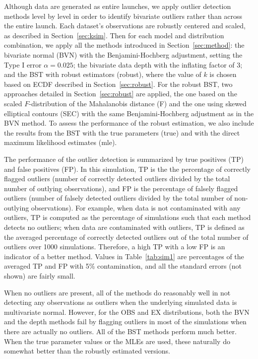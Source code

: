 \documentclass[12pt]{article}
\begin{document}
\begin{doublespacing}
Although data are generated as entire launches, we apply outlier detection methods level by level in order to identify bivariate outliers rather than across the entire launch.  Each dataset's observations are robustly centered and scaled, as described in Section~\ref{sec:ksim}. Then for each model and distribution combination, we apply all the methods introduced in Section~\ref{sec:method}:  the bivariate normal (BVN) with the Benjamini-Hochberg adjustment, setting the Type I error $\alpha=0.025$; the bivariate data depth with the inflating factor of 3; and the BST with robust estimators (robust), where the value of $k$ is chosen based on ECDF described in Section~\ref{sec:robust}. For the robust BST, two approaches detailed in Section~\ref{sec:robust} are applied, the one based on the scaled $F$-distribution of the Mahalanobis distance (F) and the one using skewed elliptical contours (SEC) with the same Benjamini-Hochberg adjustment as in the BVN method. To assess the performance of the robust estimation, we also include the results from the BST with the true parameters (true) and with the direct maximum likelihood estimates (mle).

The performance of the outlier detection is summarized by true positives (TP) and false positives (FP). In this simulation, TP is the the percentage of correctly flagged outliers (number of correctly detected outliers divided by the total number of outlying observations), and FP is the percentage of falsely flagged outliers (number of falsely detected outliers divided by the total number of non-outlying observations). For example, when data is not contaminated with any outliers, TP is computed as the percentage of simulations such that each method detects no outliers;  when data are contaminated with outliers, TP is defined as the averaged percentage of correctly detected outliers out of the total number of outliers over 1000 simulations. Therefore, a high TP with a low FP is an indicator of a better method. Values in Table~\ref{tab:sim1} are percentages of the averaged TP and FP with 5\% contamination,  and all the standard errors (not shown) are fairly small.  

When no outliers are present, all of the methods do reasonably well in not detecting any observations as outliers when the underlying simulated data is multivariate normal.  However, for the OBS and EX distributions, both the BVN and the depth methods fail by flagging outliers in most of the simulations when there are actually no outliers.  All of the BST methods perform much better.  When the true parameter values or the MLEs are used, these naturally do somewhat better than the robustly estimated versions.   


\end{doublespacing}
\end{document}
